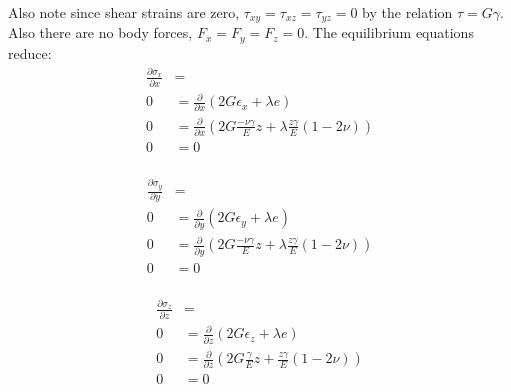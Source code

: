Also note since shear strains are zero, $\tau_{xy} = \tau_{xz} = \tau_{yz} = 0$ by the relation $\tau = G\gamma$. Also there 
are no body forces, $F_x = F_y = F_z = 0$.
The equilibrium equations reduce:
\[
\begin{aligned}
    \frac{\partial \sigma_{x}}{\partial x} &= \\
    0 &= \frac{\partial}{\partial x} (2G \epsilon_x + \lambda e) \\
    0 &= \frac{\partial}{\partial x} (2G \frac{-\nu\gamma}{E} z + \lambda \frac{z\gamma}{E} (1 - 2\nu)) \\
    0 &= 0 \\
\end{aligned}
\]

\[
\begin{aligned}
    \frac{\partial \sigma_{y}}{\partial y} &=  \\
    0 &= \frac{\partial}{\partial y} (2G \epsilon_y + \lambda e)  \\
    0 &= \frac{\partial}{\partial y} (2G \frac{-\nu\gamma}{E} z + \lambda \frac{z\gamma}{E} (1 - 2\nu)) \\
    0 &= 0 \\
\end{aligned}
\]

\[
\begin{aligned}
    \frac{\partial \sigma_{z}}{\partial z} &=  \\
    0 &= \frac{\partial}{\partial z} (2G \epsilon_z + \lambda e)  \\
    0 &= \frac{\partial}{\partial z} (2G \frac{\gamma}{E} z +  \frac{z\gamma}{E} (1 - 2\nu)) \\
    0 &= 0 \\
\end{aligned}
\]